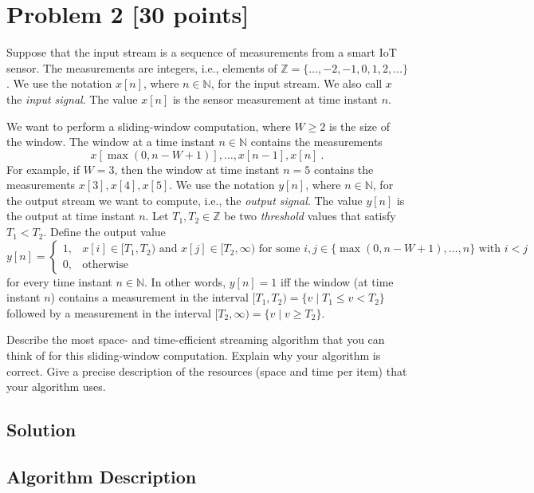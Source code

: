 \documentclass[11pt]{article}
\newcommand{\N}{\mathbb{N}}
\newcommand{\Z}{\mathbb{Z}}
\begin{document}
\newpage
\section*{Problem 2 [30 points]}

Suppose that the input stream is a sequence of measurements from a smart IoT sensor. The measurements are integers, i.e., elements of $\Z = \{ \ldots, -2, -1, 0, 1, 2, \ldots \}$. We use the notation $x[n]$, where $n \in \N$, for the input stream. We also call $x$ the \emph{input signal}. The value $x[n]$ is the sensor measurement at time instant $n$.

We want to perform a sliding-window computation, where $W \geq 2$ is the size of the window. The window at a time instant $n \in \N$ contains the measurements
\[
  x[\max(0, n - W + 1)], \ldots, x[n-1], x[n]
  \ .
\]
For example, if $W = 3$, then the window at time instant $n = 5$ contains the measurements $x[3], x[4], x[5]$.
%
We use the notation $y[n]$, where $n \in \N$, for the output stream we want to compute, i.e., the \emph{output signal}. The value $y[n]$ is the output at time instant $n$. Let $T_1, T_2 \in \Z$ be two \emph{threshold} values that satisfy $T_1 < T_2$. Define the output value
\[
  y[n] = \begin{cases}
    1, &\text{$x[i] \in [T_1,T_2)$ and $x[j] \in [T_2,\infty)$ for some $i, j \in \{\max(0,n-W+1),\ldots,n\}$ with $i < j$}
    \\
    0, &\text{otherwise}
  \end{cases}
\]
for every time instant $n \in \N$. In other words, $y[n] = 1$ iff the window (at time instant $n$) contains a measurement in the interval $[T_1, T_2) = \{ v \mid T_1 \leq v < T_2 \}$ followed by a measurement in the interval $[T_2, \infty) = \{ v \mid v \geq T_2 \}$.

Describe the most space- and time-efficient streaming algorithm that you can think of for this sliding-window computation. Explain why your algorithm is correct. Give a precise description of the resources (space and time per item) that your algorithm uses.

\subsection*{Solution}

\subsection*{Algorithm Description}
\end{document}
